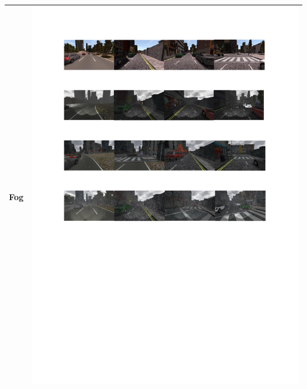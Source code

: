 \documentclass{svproc}
\begin{document}
\begin{table}[!ht]
\begin{tabular}{|C{2.5cm}|C{8.5cm}|}
			Fog	& \begin{minipage}{.9\textwidth}\includegraphics[scale=.5,trim=2cm 20.5cm 2cm 6.5cm,clip]{examples.pdf}\end{minipage} \\ \hline

\end{tabular}
\end{table}
\end{document}
